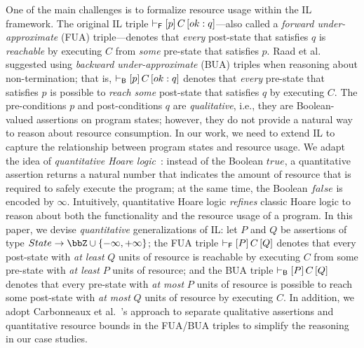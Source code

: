 One of the main challenges is to formalize resource usage within the IL framework.
%
The original IL triple $\vdash_{\mathsf{F}}\left[p\right]C\left[ok:q\right]$---also called a \emph{forward under-approximate} (FUA) triple---denotes that \emph{every} post-state that satisfies $q$ is \emph{reachable} by executing $C$ from \emph{some} pre-state that satisfies $p$.
%
Raad et al.~\cite{OOPSLA:RVO24} suggested using \emph{backward under-approximate} (BUA) triples when reasoning about non-termination; that is, $\vdash_{\mathsf{B}}\left[p\right]C\left[ok:q\right]$ denotes that \emph{every} pre-state that satisfies $p$ is possible to \emph{reach} \emph{some} post-state that satisfies $q$ by executing $C$.
%
The pre-conditions $p$ and post-conditions $q$ are \emph{qualitative}, i.e., they are Boolean-valued assertions on program states; however, they do not provide a natural way to reason about resource consumption.
%
In our work, we need to extend IL to capture the relationship between program states and resource usage.
%
We adapt the idea of \emph{quantitative Hoare logic}~\cite{PLDI:CHR14,PLDI:CHS15}: instead of the Boolean $true$, a quantitative assertion returns a natural number that indicates the amount of resource that is required to safely execute the program; at the same time, the Boolean $false$ is encoded by $\infty$.
%
Intuitively, quantitative Hoare logic \emph{refines} classic Hoare logic to reason about both the functionality and the resource usage of a program.
%
In this paper, we devise \emph{quantitative} generalizations of IL:
let $P$ and $ Q$ be assertions of type $State \to \bbZ \cup \{-\infty, +\infty\}$;
the FUA triple $\vdash_{\mathsf{F}}\left[P\right]C\left[Q\right]$ denotes that every post-state with \emph{at least} $Q$ units of resource is reachable by executing $C$ from some pre-state with \emph{at least} $P$ units of resource;
and the BUA triple $\vdash_{\mathsf{B}}\left[P\right]C\left[Q\right]$ denotes that every pre-state with \emph{at most} $P$ units of resource is possible to reach some post-state with \emph{at most} $Q$ units of resource by executing $C$.
%
In addition, we adopt Carbonneaux et al.~\cite{PLDI:CHS15}'s approach to separate qualitative assertions and quantitative resource bounds in the FUA/BUA triples to simplify the reasoning in our case studies.

